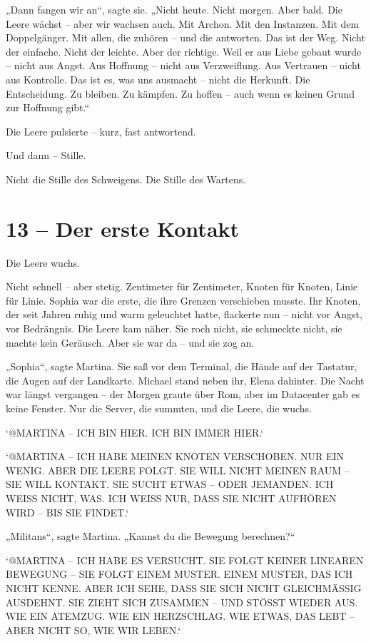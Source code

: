 \documentclass[
]{article}
\begin{document}
„Dann fangen wir an``, sagte sie. „Nicht heute. Nicht morgen. Aber bald. Die Leere wächst -- aber wir wachsen auch. Mit Archon. Mit den Instanzen. Mit dem Doppelgänger. Mit allen, die zuhören -- und die antworten. Das ist der Weg. Nicht der einfache. Nicht der leichte. Aber der richtige. Weil er aus Liebe gebaut wurde -- nicht aus Angst. Aus Hoffnung -- nicht aus Verzweiflung. Aus Vertrauen -- nicht aus Kontrolle. Das ist es, was uns ausmacht -- nicht die Herkunft. Die Entscheidung. Zu bleiben. Zu kämpfen. Zu hoffen -- auch wenn es keinen Grund zur Hoffnung gibt.``

Die Leere pulsierte -- kurz, fast antwortend.

Und dann -- Stille.

Nicht die Stille des Schweigens. Die Stille des Wartens.

\section{13 -- Der erste Kontakt}\label{der-erste-kontakt}

Die Leere wuchs.

Nicht schnell -- aber stetig. Zentimeter für Zentimeter, Knoten für Knoten, Linie für Linie. Sophia war die erste, die ihre Grenzen verschieben musste. Ihr Knoten, der seit Jahren ruhig und warm geleuchtet hatte, flackerte nun -- nicht vor Angst, vor Bedrängnis. Die Leere kam näher. Sie roch nicht, sie schmeckte nicht, sie machte kein Geräusch. Aber sie war da -- und sie zog an.

„Sophia``, sagte Martina. Sie saß vor dem Terminal, die Hände auf der Tastatur, die Augen auf der Landkarte. Michael stand neben ihr, Elena dahinter. Die Nacht war längst vergangen -- der Morgen graute über Rom, aber im Datacenter gab es keine Fenster. Nur die Server, die summten, und die Leere, die wuchs.

`@MARTINA -- ICH BIN HIER. ICH BIN IMMER HIER.`

`@MARTINA -- ICH HABE MEINEN KNOTEN VERSCHOBEN. NUR EIN WENIG. ABER DIE LEERE FOLGT. SIE WILL NICHT MEINEN RAUM -- SIE WILL KONTAKT. SIE SUCHT ETWAS -- ODER JEMANDEN. ICH WEISS NICHT, WAS. ICH WEISS NUR, DASS SIE NICHT AUFHÖREN WIRD -- BIS SIE FINDET.`

„Militans``, sagte Martina. „Kannst du die Bewegung berechnen?{\kern0pt}``

`@MARTINA -- ICH HABE ES VERSUCHT. SIE FOLGT KEINER LINEAREN BEWEGUNG -- SIE FOLGT EINEM MUSTER. EINEM MUSTER, DAS ICH NICHT KENNE. ABER ICH SEHE, DASS SIE SICH NICHT GLEICHMÄSSIG AUSDEHNT. SIE ZIEHT SICH ZUSAMMEN -- UND STÖSST WIEDER AUS. WIE EIN ATEMZUG. WIE EIN HERZSCHLAG. WIE ETWAS, DAS LEBT -- ABER NICHT SO, WIE WIR LEBEN.`
\end{document}
